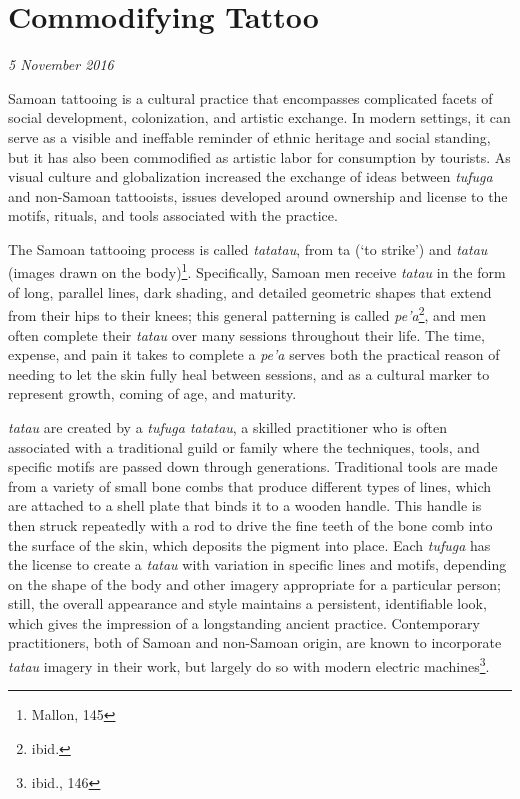 \section{Commodifying Tattoo}

\textit{5 November 2016}

Samoan tattooing is a cultural practice that encompasses complicated facets of
social development, colonization, and artistic exchange. In modern settings, it
can serve as a visible and ineffable reminder of ethnic heritage and social
standing, but it has also been commodified as artistic labor for consumption by
tourists. As visual culture and globalization increased the exchange of ideas
between \textit{tufuga} and non-Samoan tattooists, issues developed around
ownership and license to the motifs, rituals, and tools associated with the
practice.

The Samoan tattooing process is called \textit{tatatau}, from ta (`to strike')
and \textit{tatau} (images drawn on the body)\footnote{Mallon, 145}.
Specifically, Samoan men receive \textit{tatau} in the form of long, parallel
lines, dark shading, and detailed geometric shapes that extend from their hips
to their knees; this general patterning is called \textit{pe'a}\footnote{ibid.},
and men often complete their \textit{tatau} over many sessions throughout their
life. The time, expense, and pain it takes to complete a \textit{pe'a} serves
both the practical reason of needing to let the skin fully heal between
sessions, and as a cultural marker to represent growth, coming of age, and
maturity.

\textit{tatau} are created by a \textit{tufuga tatatau}, a skilled practitioner
who is often associated with a traditional guild or family where the techniques,
tools, and specific motifs are passed down through generations. Traditional
tools are made from a variety of small bone combs that produce different types
of lines, which are attached to a shell plate that binds it to a wooden handle.
This handle is then struck repeatedly with a rod to drive the fine teeth of the
bone comb into the surface of the skin, which deposits the pigment into place.
Each \textit{tufuga} has the license to create a \textit{tatau} with variation
in specific lines and motifs, depending on the shape of the body and other
imagery appropriate for a particular person; still, the overall appearance and
style maintains a persistent, identifiable look, which gives the impression of a
longstanding ancient practice. Contemporary practitioners, both of Samoan and
non-Samoan origin, are known to incorporate \textit{tatau} imagery in their
work, but largely do so with modern electric machines\footnote{ibid., 146}.

